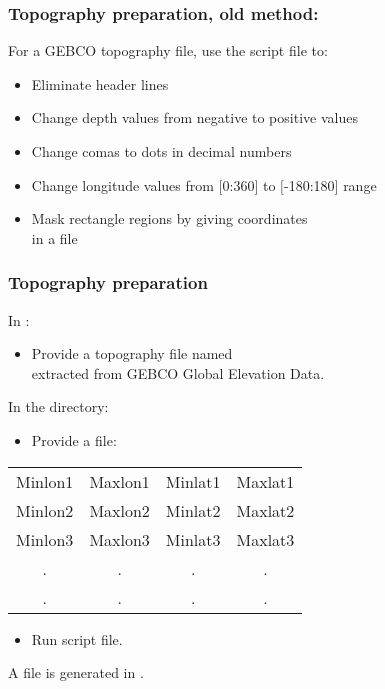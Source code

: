 \begin{frame}
\frametitle{Topography preparation, old method: }

\centerline{
 For a GEBCO topography file, use the script file  to:
}
\small{
\begin{itemize}
\item Eliminate header lines
\item Change depth values from negative to positive values
\item Change comas to dots in decimal numbers 
\item Change longitude values from $[$0:360$]$ to $[$-180:180$]$ range
\item Mask rectangle regions by giving coordinates \\
in a  file
\end{itemize}
}
\end{frame}


\begin{frame}
\frametitle{Topography preparation}

\centerline{In :}
\begin{itemize}
\item \small Provide a topography file named  \\
 extracted from GEBCO Global Elevation Data.
\end{itemize}

\centerline{In the  directory:}

\begin{itemize}
\item \small Provide a  file:
\end{itemize}

\vspace{-0.5cm}
\begin{table}
\tiny
\centering
\begin{tabular}{|cccc|}
\hline
Minlon1 & Maxlon1 & Minlat1 & Maxlat1\\
Minlon2 & Maxlon2 & Minlat2 & Maxlat2\\
Minlon3 & Maxlon3 & Minlat3 & Maxlat3\\
   .    &   .   &   .   &  .   \\
   .    &   .   &   .   &  .   \\
\hline
\end{tabular}
\end{table}

\vspace{-0.5cm}
\begin{itemize}
\item Run  script file.
\end{itemize}
\Large{
\centerline{A  file is generated in .}
}
\end{frame}

